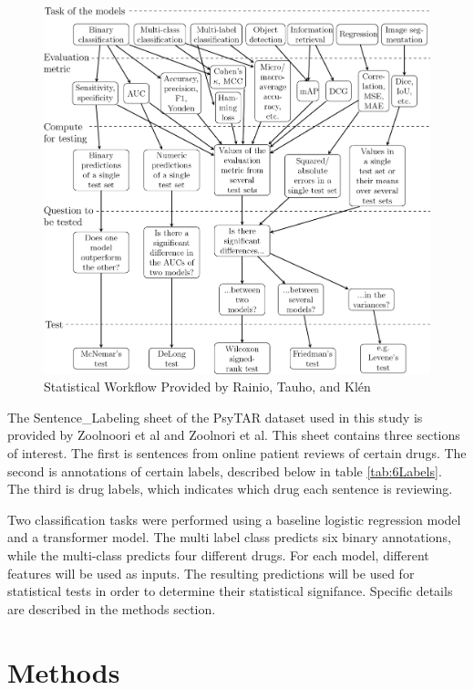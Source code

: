 \documentclass[10.7pt, onecolumn]{article}
\begin{document}
\begin{figure}[H]
  \centering
  \includegraphics[width=\textwidth]{images/41598_2024_56706_Fig3_HTML.png}
  \caption{Statistical Workflow Provided by Rainio, Tauho, and Klén\cite{statsBased}}
  \label{fig:statistical test workflow}
\end{figure}
 
The Sentence\_Labeling sheet of the PsyTAR dataset used in this study is provided by Zoolnoori et al\cite{psyTAR1} and Zoolnori et al\cite{psyTar2}. This sheet contains three sections of interest. The first is sentences from online patient reviews of certain drugs. The second is annotations of certain labels, described below in table \ref{tab:6Labels}. The third is drug labels, which indicates which drug each sentence is reviewing.

Two classification tasks were performed using a baseline logistic regression model and a transformer model. The multi label class predicts six binary annotations, while the multi-class predicts four different drugs. For each model, different features will be used as inputs. The resulting predictions will be used for statistical tests in order to determine their statistical signifance. Specific details are described in the methods section.

\section{Methods}\label{methods}
\end{document}
